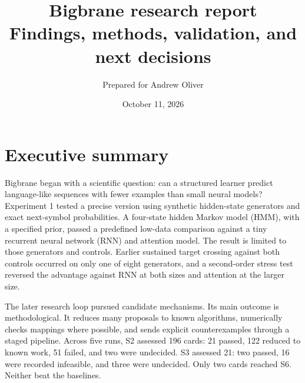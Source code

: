 
\usepackage{amsmath,amssymb}
\usepackage{needspace}
\usetikzlibrary{positioning}
\title{\vspace{-1.2cm}\color{palA}\Huge Bigbrane research report\\[3pt]\large Findings, methods, validation, and next decisions}
\author{Prepared for Andrew Oliver}
\date{October 11, 2026}

\maketitle
\thispagestyle{fancy}

\section{Executive summary}

Bigbrane began with a scientific question: can a structured learner predict language-like sequences with fewer examples than small neural models? Experiment 1 tested a precise version using synthetic hidden-state generators and exact next-symbol probabilities. A four-state hidden Markov model (HMM), with a specified prior, passed a predefined low-data comparison against a tiny recurrent neural network (RNN) and attention model. The result is limited to those generators and controls. Earlier sustained target crossing against both controls occurred on only one of eight generators, and a second-order stress test reversed the advantage against RNN at both sizes and attention at the larger size.

The later research loop pursued candidate mechanisms. Its main outcome is methodological. It reduces many proposals to known algorithms, numerically checks mappings where possible, and sends explicit counterexamples through a staged pipeline. Across five runs, S2 assessed 196 cards: 21 passed, 122 reduced to known work, 51 failed, and two were undecided. S3 assessed 21: two passed, 16 were recorded infeasible, and three were undecided. Only two cards reached S6. Neither beat the baselines.

